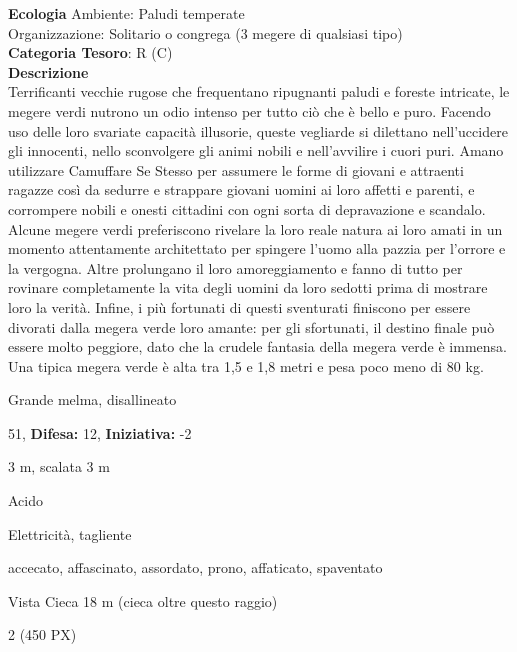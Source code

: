\begin{multicols}{2}
{\textbf{Ecologia}
Ambiente: Paludi temperate\\
Organizzazione: Solitario o congrega (3 megere di qualsiasi tipo)\\
\textbf{Categoria Tesoro}: R (C)\\
\textbf{Descrizione}\\
Terrificanti vecchie rugose che frequentano ripugnanti paludi e foreste intricate, le megere verdi nutrono un odio intenso per tutto ciò che è bello e puro. Facendo uso delle loro svariate capacità illusorie, queste vegliarde si dilettano nell'uccidere gli innocenti, nello sconvolgere gli animi nobili e nell'avvilire i cuori puri. Amano utilizzare Camuffare Se Stesso per assumere le forme di giovani e attraenti ragazze così da sedurre e strappare giovani uomini ai loro affetti e parenti, e corrompere nobili e onesti cittadini con ogni sorta di depravazione e scandalo. Alcune megere verdi preferiscono rivelare la loro reale natura ai loro amati in un momento attentamente architettato per spingere l'uomo alla pazzia per l'orrore e la vergogna. Altre prolungano il loro amoreggiamento e fanno di tutto per rovinare completamente la vita degli uomini da loro sedotti prima di mostrare loro la verità. Infine, i più fortunati di questi sventurati finiscono per essere divorati dalla megera verde loro amante: per gli sfortunati, il destino finale può essere molto peggiore, dato che la crudele fantasia della megera verde è immensa. Una tipica megera verde è alta tra 1,5 e 1,8 metri e pesa poco meno di 80 kg.

\noindent
\begin{description}[noitemsep, topsep=0pt, parsep=0pt, partopsep=0pt, leftmargin=0cm, labelwidth=2.2cm]
	\item[\textbf{Taglia/Tipo:}] Grande melma, disallineato
	\item[\textbf{Caratt.:}] 
	\item[\textbf{Punti Ferita:}] 51,  \textbf{Difesa:} 12,  \textbf{Iniziativa:} -2
	\item[\textbf{Movimento:}] 3 m, scalata 3 m
	\item[\textbf{Tiri Salvez.:}] 
	\item[\textbf{Res. Danni:}] Acido
	\item[\textbf{Imm. Danni:}] Elettricità, tagliente
	\item[\textbf{Immunità:}] accecato, affascinato, assordato, prono, affaticato, spaventato
	\item[\textbf{Sensi:}] Vista Cieca 18 m (cieca oltre questo raggio)
	\item[\textbf{Sfida:}] 2 (450 PX)\smallskip
\end{description}

}
\end{multicols}

